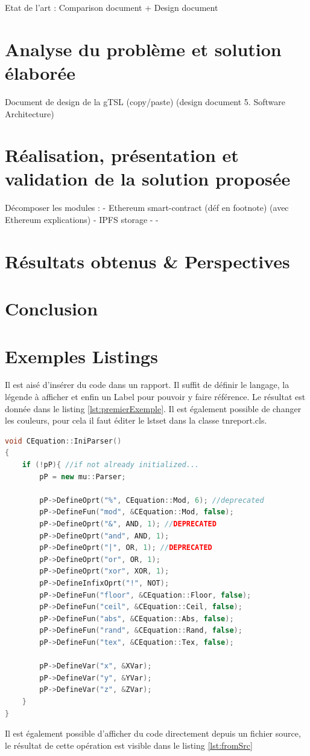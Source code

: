 \documentclass{tnreport}
\begin{document}
Etat de l'art : Comparison document + Design document

\chapter{Analyse du problème et solution élaborée}

Document de design de la gTSL (copy/paste)
(design document 5. Software Architecture)

\chapter{Réalisation, présentation et validation de la solution proposée}

Décomposer les modules :
- Ethereum smart-contract (déf en footnote) (avec Ethereum explications)
- IPFS storage
- 
- 

\chapter{Résultats obtenus \& Perspectives}

\chapter{Conclusion}

\cleardoublepage

\chapter{Exemples Listings}

Il est aisé d'insérer du code dans un rapport. Il suffit de définir le langage, la légende à afficher et enfin un Label pour pouvoir y faire référence. Le résultat est donnée dans le listing \ref{lst:premierExemple}. Il est également possible de changer les couleurs, pour cela il faut éditer le lstset dans la classe tnreport.cls.

\begin{lstlisting}[language=c++, caption={Premier Exemple}, label={lst:premierExemple}]
void CEquation::IniParser()
{
	if (!pP){ //if not already initialized...
		pP = new mu::Parser;

		pP->DefineOprt("%", CEquation::Mod, 6); //deprecated
		pP->DefineFun("mod", &CEquation::Mod, false);
		pP->DefineOprt("&", AND, 1); //DEPRECATED
		pP->DefineOprt("and", AND, 1);
		pP->DefineOprt("|", OR, 1); //DEPRECATED
		pP->DefineOprt("or", OR, 1);
		pP->DefineOprt("xor", XOR, 1);
		pP->DefineInfixOprt("!", NOT);
		pP->DefineFun("floor", &CEquation::Floor, false);
		pP->DefineFun("ceil", &CEquation::Ceil, false);
		pP->DefineFun("abs", &CEquation::Abs, false);
		pP->DefineFun("rand", &CEquation::Rand, false);
		pP->DefineFun("tex", &CEquation::Tex, false);
	
		pP->DefineVar("x", &XVar);
		pP->DefineVar("y", &YVar);
		pP->DefineVar("z", &ZVar);
	}
}
\end{lstlisting}
\clearpage
Il est également possible d'afficher du code directement depuis un fichier source, le résultat de cette opération est visible dans le listing \ref{lst:fromSrc}

\end{document}
